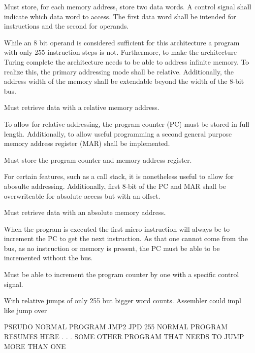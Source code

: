 \begin{feat-requirement}
Must store, for each memory address, store two data words. A control signal shall indicate which data word to access. The first data word shall be intended for instructions and the second for operands.
\end{feat-requirement}

While an 8 bit operand is considered sufficient for this architecture a program with only 255 instruction steps is not. Furthermore, to make the architecture Turing complete the architecture needs to be able to address infinite memory. To realize this, the primary addressing mode shall be relative. Additionally, the address width of the memory shall be extendable beyond the width of the 8-bit bus.

\begin{feat-requirement}
Must retrieve data with a relative memory address. 
\end{feat-requirement}

To allow for relative addressing, the program counter (PC) must be stored in full length. Additionally, to allow useful programming a second general purpose memory address register (MAR) shall be implemented. %

\begin{feat-requirement}
Must store the program counter and memory address register.
\end{feat-requirement}

For certain features, such as a call stack, it is nonetheless useful to allow for abosulte addressing. Additionally, first $8$-bit of the PC and MAR shall be overwriteable for absolute access but with an offset. 

\begin{feat-requirement}
Must retrieve data with an absolute memory address. 
\end{feat-requirement}


When the program is executed the first micro instruction will always be to increment the PC to get the next instruction. As that one cannot come from the bus, as no instruction or memory is present, the PC must be able to be incremented without the bus.
\begin{feat-requirement}
    Must be able to increment the program counter by one with a specific control signal.
\end{feat-requirement}

With relative jumps of only 255 but bigger word counts. 
Assembler could impl like jump over 

PSEUDO
NORMAL PROGRAM
JMP2
JPD 255 
NORMAL PROGRAM RESUMES HERE
.
.
.
SOME OTHER PROGRAM THAT NEEDS TO JUMP MORE THAN ONE





% 
